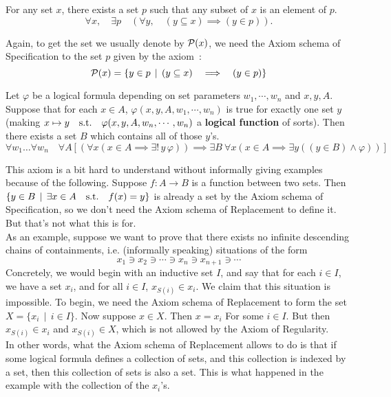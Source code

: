 \begin{axiom}
    For any set $x$, there exists a set $p$ such that any subset of $x$ is an element of $p$.
    \[
        \forall x, \quad \exists p \quad (\forall y, \quad (y \subseteq x) \implies (y \in p)).    
    \]
\end{axiom}

\begin{remark}
    Again, to get the set we usually denote by $\operatorname{\mathcal P}(x)$, we need the Axiom schema of Specification to the set $p$ given by the axiom~:
    \[
        \operatorname{\mathcal P}(x) = \{ y \in p \, \mid \, (y \subseteq x) \quad \Longrightarrow \quad (y \in p) \}    
    \]
\end{remark}

\begin{axiom}
    Let $\varphi$ be a logical formula depending on set parameters $w_1,\cdots,w_n$ and $x,y,A$. Suppose that for each $x \in A$, $\varphi(x,y,A,w_1,\cdots,w_n)$ is true for exactly one set $y$ (making $x \mapsto y \quad \text{s.t.} \quad \varphi(x,y,A,w_n,\cdots,w_n)$ a \textbf{logical function} of sorts). Then there exists a set $B$ which contains all of those $y$'s. 
    \[
        \forall w_1 \ldots \forall w_n \quad \forall A \left[ (\forall x( x \in A \implies \exists ! \, y \, \varphi)) \implies \exists B\ \forall x \left( x \in A \implies \exists y( (y \in B) \land \varphi )  \right) \right]
    \]
\end{axiom}

\begin{remark}
    This axiom is a bit hard to understand without informally giving examples because of the following. Suppose $f : A \to B$ is a function between two sets. Then $\{ y \in B \, \mid \, \exists x \in A \quad \text{s.t.} \quad f(x) = y \}$ is already a set by the Axiom schema of Specification, so we don't need the Axiom schema of Replacement to define it. But that's not what this is for. 
    \\

    As an example, suppose we want to prove that there exists no infinite descending chains of containments, i.e. (informally speaking) situations of the form
    \[
        x_1 \ni x_2 \ni \cdots \ni x_n \ni x_{n+1} \ni \cdots    
    \]
    Concretely, we would begin with an inductive set $I$, and say that for each $i \in I$, we have a set $x_i$, and for all $i \in I$, $x_{S(i)} \in x_i$. We claim that this situation is impossible. To begin, we need the Axiom schema of Replacement to form the set $X = \{ x_i \, \mid \, i \in I \}$. Now suppose $x \in X$. Then $x = x_i$ For some $i \in I$. But then $x_{S(i)} \in x_i$ and $x_{S(i)} \in X$, which is not allowed by the Axiom of Regularity. 
    \\

    In other words, what the Axiom schema of Replacement allows to do is that if some logical formula defines a collection of sets, and this collection is indexed by a set, then this collection of sets is also a set. This is what happened in the example with the collection of the $x_i$'s. 
\end{remark}